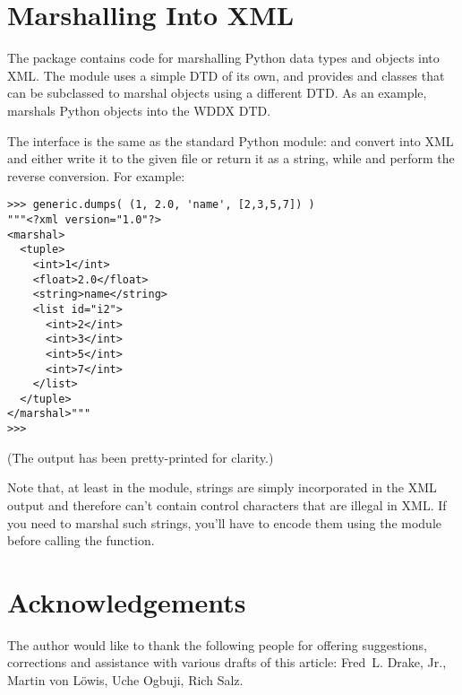 \documentclass{howto}
\begin{document}
\begin{comment}


\subsection{Related Links}

The W3C's XSL page is at \url{http://www.w3.org/Style/XSL/}, and has links
to the XSLT specifications and to friendlier tutorials.

\end{comment}


\section{Marshalling Into XML}

The  package contains code for marshalling Python
data types and objects into XML.  The 
module uses a simple DTD of its own, and provides 
and  classes that can be subclassed to marshal
objects using a different DTD.  As an example,  
marshals Python objects into the WDDX DTD.

The interface is the same as the standard Python 
module:  and
 convert  into XML and either
write it to the given file or return it as a string, while
 and 
perform the reverse conversion.  For example:

\begin{verbatim}
>>> generic.dumps( (1, 2.0, 'name', [2,3,5,7]) )
"""<?xml version="1.0"?>
<marshal>
  <tuple>
    <int>1</int>
    <float>2.0</float>
    <string>name</string>
    <list id="i2">
      <int>2</int>
      <int>3</int>
      <int>5</int>
      <int>7</int>
    </list>
  </tuple>
</marshal>"""
>>>
\end{verbatim}

(The output has been pretty-printed for clarity.)

Note that, at least in the  module, strings are simply
incorporated in the XML output and therefore can't contain control
characters that are illegal in XML.  If you need to marshal such
strings, you'll have to encode them using the  module
before calling the  function. 


\section{Acknowledgements \label{section-acks}}

The author would like to thank the following people for offering
suggestions, corrections and assistance with various drafts of this
article: Fred~L. Drake, Jr., Martin von L\"owis, 
Uche Ogbuji, Rich Salz.
\end{document}
